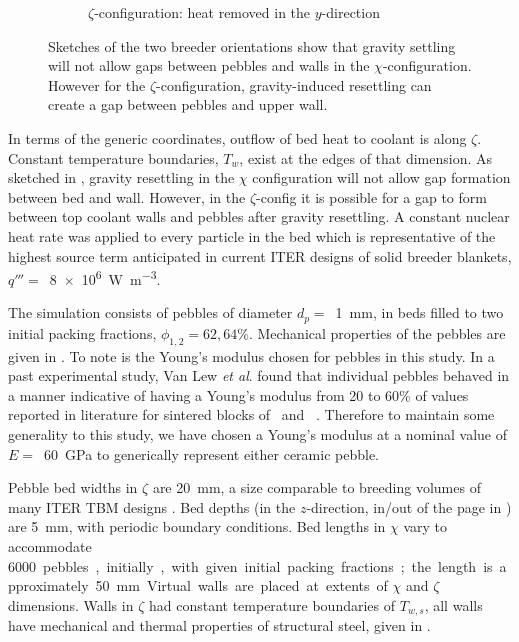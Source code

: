 \begin{figure}[!ht]
\begin{subfigure}[b]{0.22\textwidth}
        \caption{$\zeta$-configuration: heat removed in the $y$-direction}\label{fig:y-domain}
    \end{subfigure}
    \caption{Sketches of the two breeder orientations show that gravity settling will not allow gaps between pebbles and walls in the $\chi$-configuration. However for the $\zeta$-configuration, gravity-induced resettling can create a gap between pebbles and upper wall. }\label{fig:domains}
\end{figure}

In terms of the generic coordinates, outflow of bed heat to coolant is along $\zeta$. Constant temperature boundaries, $T_w$, exist at the edges of that dimension. As sketched in , gravity resettling in the $\chi$ configuration will not allow gap formation between bed and wall. However, in the $\zeta$-config it is possible for a gap to form between top coolant walls and pebbles after gravity resettling. A constant nuclear heat rate was applied to every particle in the bed which is representative of the highest source term anticipated in current ITER designs of solid breeder blankets, $q''' = $~\SI{8e6}{\watt\per\meter\cubed}.

The simulation consists of pebbles of diameter $d_p = $~\SI{1}{\milli\meter}, in beds filled to two initial packing fractions, $\phi_{1,2} = 62, 64\%$. Mechanical properties of the pebbles are given in . To note is the Young's modulus chosen for pebbles in this study. In a past experimental study, Van Lew \textit{et al}. found that individual pebbles behaved in a manner indicative of having a Young's modulus from 20 to 60\% of values reported in literature for sintered blocks of \lit~and \lis~\cite{VanLew2015a}. Therefore to maintain some generality to this study, we have chosen a Young's modulus at a nominal value of $E=$~\SI{60}{\giga\pascal} to generically represent either ceramic pebble.

Pebble bed widths in $\zeta$ are \SI{20}{\milli\meter}, a size comparable to breeding volumes of many ITER TBM designs \cite{Hernandez2013,Cho2008,Feng2012a}. Bed depths (in the $z$-direction, in/out of the page in ) are \SI{5}{\milli\meter}, with periodic boundary conditions. Bed lengths in $\chi$ vary to accommodate \SI{6000} pebbles, initially, with given initial packing fractions; the length is approximately \SI{50}{\milli\meter}. Virtual walls are placed at extents of $\chi$ and $\zeta$ dimensions. Walls in $\zeta$ had constant temperature boundaries of $T_{w,s}$, all walls have mechanical and thermal properties of structural steel, given in .

